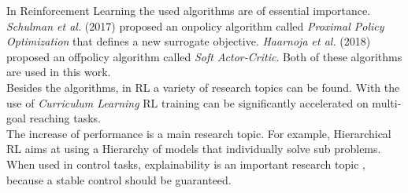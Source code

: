\newline
In Reinforcement Learning the used algorithms are of essential importance.
\emph{Schulman et al.} (2017) \cite{schulman2017proximal} proposed an onpolicy
algorithm called \emph{Proximal Policy Optimization} that defines a new surrogate objective.
\emph{Haarnoja et al.} (2018) \cite{haarnoja2018soft} proposed an offpolicy
algorithm called \emph{Soft Actor-Critic}. Both of these algorithms are used 
in this work.\\
Besides the algorithms, in RL a variety of research topics can be found.
With the use of \emph{Curriculum Learning} \cite{9207427} RL training can 
be significantly accelerated on multi-goal reaching tasks.\\
The increase of performance is a main research topic. 
For example, Hierarchical RL \cite{botvinick2012hierarchical} aims at 
using a Hierarchy of models that individually solve sub problems.\\
When used in control tasks, explainability is an important research topic \cite{heuillet2021explainability},
because a stable control should be guaranteed.

